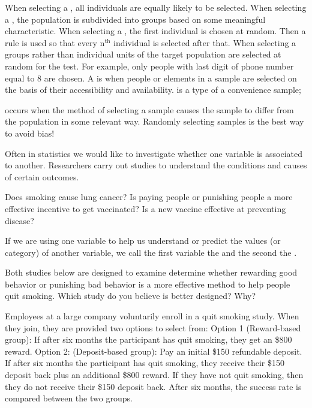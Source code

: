 \bi
\ii When selecting a , all individuals are equally likely to be selected.
\ii When selecting a , the population is subdivided into groups based on some meaningful characteristic.
\ii When selecting a , the first individual is chosen at random. Then a rule is used so that every $\mbox{n}^{\mbox{th}}$ individual is selected after that.
\ii When selecting a  groups rather than individual units of the target population are selected at random for the test. For example, only people with last digit of phone number equal to 8 are chosen.
\ii A  is when people or elements in a sample are selected on the basis of their accessibility and availability.
\ii {} is a type of a convenience sample;
\ei


\bbox
\textbf{} occurs when the method of selecting a sample causes the sample to differ from the population in some relevant way. Randomly selecting samples is the best way to avoid bias!
\ebox


\clearpage


Often in statistics we would like to investigate whether one variable is associated to another. Researchers carry out studies to understand the conditions and causes of certain outcomes.

\bi
\ii Does smoking cause lung cancer?
\ii Is paying people or punishing people a more effective incentive to get vaccinated?
\ii Is a new vaccine effective at preventing disease?
\ei

\bbox
If we are using one variable to help us understand or predict the values (or category) of another variable, we call the first variable the \textbf{} and the second the \textbf{}.
\ebox

\bb[resume]
\ii Both studies below are designed to examine determine whether rewarding good behavior or punishing bad behavior is a more effective method to help people quit smoking. Which study do you believe is better designed? Why?

\bb
\ii Employees at a large company voluntarily enroll in a quit smoking study. When they join, they are provided two options to select from:
\bi
\ii Option 1 (Reward-based group): If after six months the participant has quit smoking, they get an \$800 reward.
\ii Option 2: (Deposit-based group): Pay an initial \$150 refundable deposit. If after six months the participant has quit smoking, they receive their \$150 deposit back plus an additional \$800 reward. If they have not quit smoking, then they do not receive their \$150 deposit back.
\ei
After six months, the success rate is compared between the two groups.

